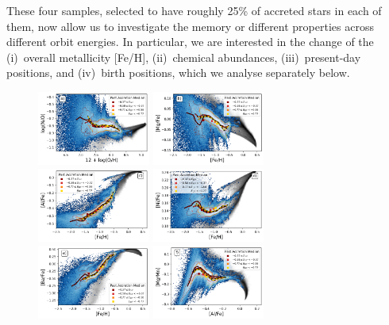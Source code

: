 \documentclass[fleqn,usenatbib]{mnras}
\begin{document}
These four samples, selected to have roughly 25\% of accreted stars in each of them, now allow us to investigate the memory or different properties across different orbit energies. In particular, we are interested in the change of the (i)~overall metallicity [Fe/H], (ii)~chemical abundances, (iii)~present-day positions, and (iv)~birth positions, which we analyse separately below.

\begin{figure}
    \centering
    \includegraphics[width=0.33\textwidth]{figures/xfe_feh_zones_NO.png}    \includegraphics[width=0.33\textwidth]{figures/xfe_feh_zones_Mg.png}
    \includegraphics[width=0.33\textwidth]{figures/xfe_feh_zones_Al.png}
    \includegraphics[width=0.33\textwidth]{figures/xfe_feh_zones_Ni.png}
    \includegraphics[width=0.33\textwidth]{figures/xfe_feh_zones_Ba.png}
    \includegraphics[width=0.33\textwidth]{figures/xfe_feh_zones_MgMn.png}

\end{figure}
\end{document}
